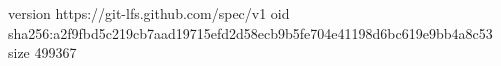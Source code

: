 version https://git-lfs.github.com/spec/v1
oid sha256:a2f9fbd5c219cb7aad19715efd2d58ecb9b5fe704e41198d6bc619e9bb4a8c53
size 499367
